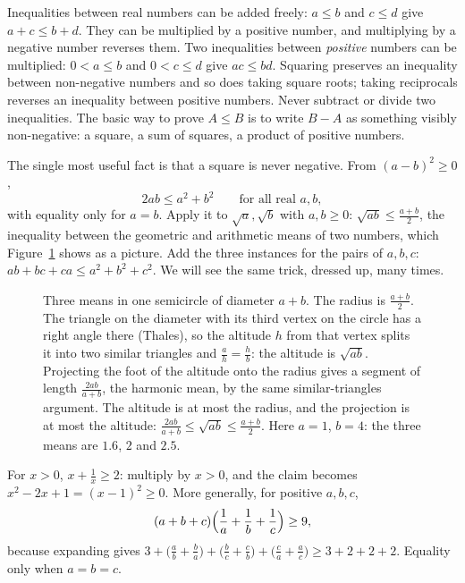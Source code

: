 \begin{reminder}
Inequalities between real numbers can be added freely: $a\le b$ and $c\le d$ give $a+c\le b+d$. They can be multiplied by a positive number,
and multiplying by a negative number reverses them. Two inequalities between \emph{positive} numbers can be multiplied: $0<a\le b$ and $0<c\le d$
give $ac\le bd$. Squaring preserves an inequality between non-negative numbers and so does taking square roots; taking reciprocals reverses an
inequality between positive numbers. Never subtract or divide two inequalities. The basic way to prove $A\le B$ is to write $B-A$ as something
visibly non-negative: a square, a sum of squares, a product of positive numbers.
\end{reminder}

The single most useful fact is that a square is never negative. From $(a-b)^2\ge0$,
\[
2ab\le a^2+b^2\qquad\text{for all real }a,b,
\]
with equality only for $a=b$. Apply it to $\sqrt a,\sqrt b$ with $a,b\ge0$: $\sqrt{ab}\le\frac{a+b}2$, the inequality between the geometric and
arithmetic means of two numbers, which Figure~\ref{fig:semicircle} shows as a picture. Add the three instances for the pairs of $a,b,c$:
$ab+bc+ca\le a^2+b^2+c^2$. We will see the same trick, dressed up, many times.

\begin{figure}[ht]
\centering
{}
\caption{Three means in one semicircle of diameter $a+b$. The radius is $\frac{a+b}2$. The triangle on the diameter with its third vertex on the circle has a right angle there (Thales), so the altitude $h$ from that vertex splits it into two similar triangles and $\frac ah=\frac hb$: the altitude is $\sqrt{ab}$. Projecting the foot of the altitude onto the radius gives a segment of length $\frac{2ab}{a+b}$, the harmonic mean, by the same similar-triangles argument. The altitude is at most the radius, and the projection is at most the altitude: $\frac{2ab}{a+b}\le\sqrt{ab}\le\frac{a+b}2$. Here $a=1$, $b=4$: the three means are $1.6$, $2$ and $2.5$.}
\label{fig:semicircle}
\end{figure}

\begin{examplex}
For $x>0$, $x+\frac1x\ge2$: multiply by $x>0$, and the claim becomes $x^2-2x+1=(x-1)^2\ge0$. More generally, for positive $a,b,c$,
\[
(a+b+c)\Bigl(\frac1a+\frac1b+\frac1c\Bigr)\ge9,
\]
because expanding gives $3+\bigl(\frac ab+\frac ba\bigr)+\bigl(\frac bc+\frac cb\bigr)+\bigl(\frac ca+\frac ac\bigr)\ge3+2+2+2$. Equality only when $a=b=c$.
\end{examplex}

